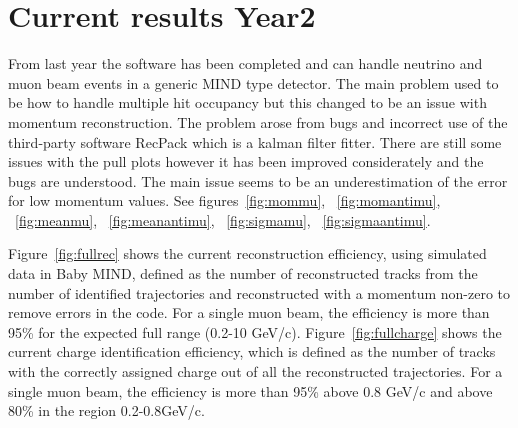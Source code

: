 \chapter{Current results Year2}
\label{a:appendix}

From last year the software has been completed and can handle neutrino and muon beam events in a generic MIND type detector. The main problem used to be how to handle multiple hit occupancy but this changed to be an issue with momentum reconstruction. The problem arose from bugs and incorrect use of the third-party software RecPack which is a kalman filter fitter. There are still some issues with the pull plots however it has been improved considerately and the bugs are understood. The main issue seems to be an underestimation of the error for low momentum values. See figures~\ref{fig:mommu}, ~\ref{fig:momantimu}, ~\ref{fig:meanmu}, ~\ref{fig:meanantimu}, ~\ref{fig:sigmamu}, ~\ref{fig:sigmaantimu}.

Figure~\ref{fig:fullrec} shows the current reconstruction efficiency, using simulated data in Baby MIND, defined as the number of reconstructed tracks from the number of identified trajectories and reconstructed with a momentum non-zero to remove errors in the code. For a single muon beam, the efficiency is more than 95\% for the expected full range (0.2-10 GeV/c). Figure~\ref{fig:fullcharge} shows the current charge identification efficiency, which is defined as the number of tracks with the correctly assigned charge out of all the reconstructed trajectories.  For a single muon beam, the efficiency is more than 95\% above 0.8 GeV/c and above 80\% in the region 0.2-0.8GeV/c.

